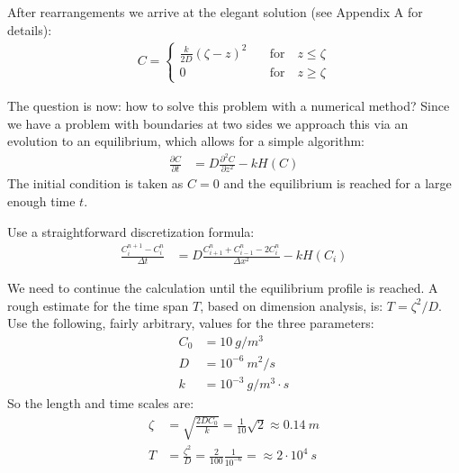 \documentclass[onecolumn]{article}
\begin{document}
After rearrangements we arrive at the elegant solution (see Appendix A for details):
%
\begin{align}
           C     =
           \begin{cases}
            \frac{k}{2D} (\zeta - z)^2  & \quad \text{for} \quad z \leq \zeta \\
\nonumber   0                           & \quad \text{for} \quad z \geq \zeta
           \end{cases}
\end{align}

The question is now: how to solve this problem with a numerical method? Since we have a problem with
boundaries at two sides we approach this via an evolution to an equilibrium, which allows for a simple
algorithm:
%
\begin{align}
          \frac{\partial C}{\partial t} & =
              D \frac{\partial^2 C}{\partial z^2} - k H(C)
\end{align}
The initial condition is taken as $C = 0$ and the equilibrium is reached for a large enough time $t$.

Use a straightforward discretization formula:
%
\begin{align}
          \frac{C_i^{n+1} - C_i^n}{\Delta t} & = D \frac{C_{i+1}^n + C_{i-1}^n - 2 C_i^n}{\Delta x^2} - k H(C_i)
\end{align}

We need to continue the calculation until the equilibrium profile is reached. A rough estimate for the
time span $T$, based on dimension analysis, is: $T = \zeta^2/D$. Use the following, fairly arbitrary, values
for the three parameters:
%
\begin{align}
\nonumber C_0   &= 10~g/m^3 \\
\nonumber D     &= 10^{-6}~m^2/s \\
\nonumber k     &= 10^{-3}~g/m^3 \cdot s
\end{align}
\noindent So the length and time scales are:
\begin{align}
\nonumber \zeta &= \sqrt{\frac{2DC_0}{k}} = \frac{1}{10}\sqrt{2} \approx 0.14~m \\
\nonumber T     &= \frac{\zeta^2}{D} = \frac{2}{100} \frac{1}{10^{-6}}= \approx 2 \cdot 10^4~s
\end{align}
\end{document}
